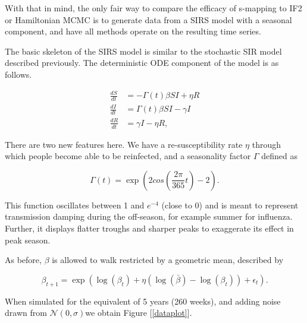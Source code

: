 	With that in mind, the only fair way to compare the efficacy of s-mapping to IF2 or Hamiltonian MCMC is to generate data from a SIRS model with a seasonal component, and have all methods operate on the resulting time series.

	The basic skeleton of the SIRS model is similar to the stochastic SIR model described previously. The deterministic ODE component of the model is as follows.

	\begin{equation}
		\begin{aligned}
			\frac{dS}{dt} & = - \Gamma(t) \beta S I + \eta R \\
			\frac{dI}{dt} & = \Gamma(t) \beta S I - \gamma I \\
			\frac{dR}{dt} & = \gamma I - \eta R,
		\end{aligned}
	\end{equation}

	There are two new features here. We have a re-susceptibility rate $\eta$ through which people become able to be reinfected, and a seasonality factor $\Gamma$ defined as

	\begin{equation}
		\Gamma(t) = \exp \left( 2 cos \left(  \frac{2 \pi}{365} t \right) - 2 \right) .
	\end{equation}

	This function oscillates between 1 and $e^{-4}$ (close to 0) and is meant to represent transmission damping during the off-season, for example summer for influenza. Further, it displays flatter troughs and sharper peaks to exaggerate its effect in peak season.

	As before, $\beta$ is allowed to walk restricted by a geometric mean, described by

	\begin{equation}
		\beta_{t+1} = \exp \left( \log(\beta_{t}) + \eta (\log(\bar{\beta}) - \log(\beta_{t})) + \epsilon_{t} \right).
	\end{equation}

	When simulated for the equivalent of 5 years (260 weeks), and adding noise drawn from $\mathcal{N}(0,\sigma)$we obtain Figure [\ref{dataplot}].


